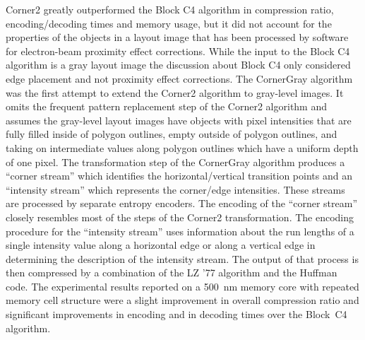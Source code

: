 \documentclass{article}
\begin{document}
Corner2 greatly outperformed the Block C4 algorithm
in compression
ratio, encoding/decoding times and memory usage, but it did
not account for the properties of the objects in a layout image that has
been processed by software for electron-beam proximity effect corrections.
While the input to the Block C4 algorithm is a gray layout image the discussion
about Block C4 only considered edge placement and not proximity effect
corrections.   The CornerGray algorithm was the first attempt
to extend the Corner2 algorithm to gray-level images.  It omits the frequent
pattern replacement step of the Corner2 algorithm and assumes the gray-level
layout images have objects with pixel intensities that are fully filled 
inside of polygon outlines, empty outside of polygon outlines, and taking
on intermediate values along polygon outlines which have a uniform depth
of one pixel.  The transformation step of the CornerGray algorithm 
produces a ``corner stream'' which identifies the horizontal/vertical
transition points and an ``intensity stream'' which represents the 
corner/edge intensities.  These streams are processed by separate entropy
encoders.  The encoding of the ``corner stream'' closely resembles most of
the steps of the Corner2 transformation.  The encoding procedure for the
``intensity stream'' uses information about the run lengths of a single 
intensity
value along a horizontal edge or along a vertical edge in determining
the description of the intensity stream.  The output of that process is then
compressed by a combination of the LZ '77 algorithm and the Huffman code.
The experimental results reported on a 500~nm memory core with repeated
memory cell structure were a slight improvement in overall compression ratio
and significant improvements in encoding and in decoding times over the
Block~C4 algorithm.
\end{document}
